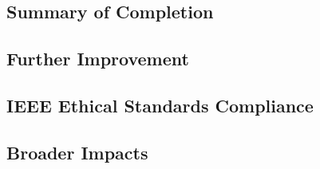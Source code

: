 \subsection{Summary of Completion}

\subsection{Further Improvement}

\subsection{IEEE Ethical Standards Compliance}

\subsection{Broader Impacts}